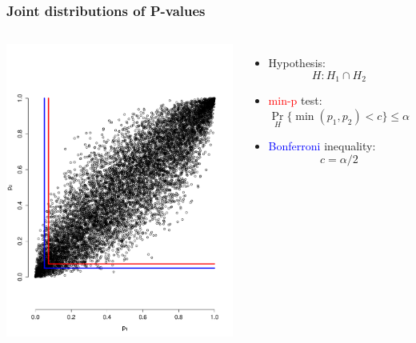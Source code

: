 \documentclass[xcolor={pdftex,dvipsnames,table}]{beamer}
\newcommand{\bi}{\begin {itemize}}
\newcommand{\ei}{\end{itemize}}
\begin{document}
\begin{frame}
\frametitle{Joint distributions of P-values }

\begin{columns}


\includegraphics[scale=.28]{figures_perm_covariates/bonferroni}



\bi

\item Hypothesis:
\[
H: H_1 \cap H_2
\]

\item \textcolor{red}{min-p} test:
\[
\displaystyle \Pr_H\Big\{\min(p_1,p_2) < c \Big\} \leq \alpha
\]


\item \textcolor{blue}{Bonferroni} inequality:\\

\[c=\alpha/2\]

\ei

\end{columns}

\end{frame}
\end{document}

